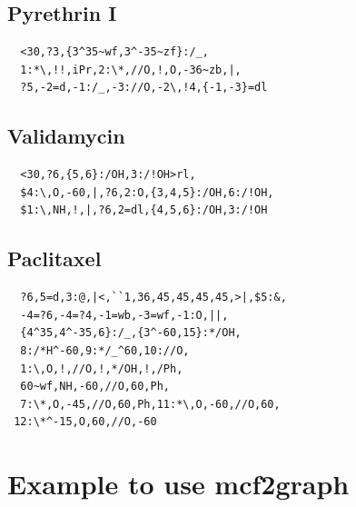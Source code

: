 \documentclass[a4paper]{article}
\makeatletter
\def\MCFstructure{\hspace{5mm}{\@strufont\char\fontnum}\advance\fontnum\@ne\relax}%
\makeatother
\begin{document}
\subsection{Pyrethrin I}
\begin{verbatim}
  <30,?3,{3^35~wf,3^-35~zf}:/_,
  1:*\,!!,iPr,2:\*,//O,!,O,-36~zb,|,
  ?5,-2=d,-1:/_,-3://O,-2\,!4,{-1,-3}=dl
\end{verbatim}
\MCFstructure
\subsection{Validamycin}
\begin{verbatim}
  <30,?6,{5,6}:/OH,3:/!OH>rl,
  $4:\,O,-60,|,?6,2:O,{3,4,5}:/OH,6:/!OH,
  $1:\,NH,!,|,?6,2=dl,{4,5,6}:/OH,3:/!OH
\end{verbatim}
\MCFstructure
\subsection{Paclitaxel}
\begin{verbatim}
  ?6,5=d,3:@,|<,``1,36,45,45,45,45,>|,$5:&,
  -4=?6,-4=?4,-1=wb,-3=wf,-1:O,||,
  {4^35,4^-35,6}:/_,{3^-60,15}:*/OH,
  8:/*H^-60,9:*/_^60,10://O,
  1:\,O,!,//O,!,*/OH,!,/Ph,
  60~wf,NH,-60,//O,60,Ph,
  7:\*,O,-45,//O,60,Ph,11:*\,O,-60,//O,60,
 12:\*^-15,O,60,//O,-60
\end{verbatim}
\MCFstructure
\onecolumn
\section{Example to use mcf2graph}
\end{document}
